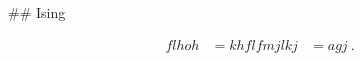 
## Ising

$$
\begin{align*}
flhoh \tag{13}
&= khfl \tag{14}
fmjlkj &= agj \tag{16}~.
\end{align*}
$$

